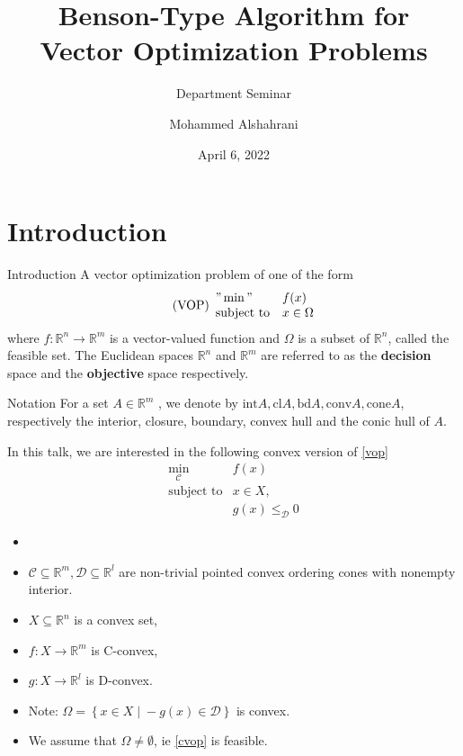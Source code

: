\documentclass[10pt,xcolor={table,dvipsnames},t,unknownkeysallowed]{beamer}
\title{\Large Benson-Type Algorithm for \\ Vector Optimization Problems}
\subtitle{Department Seminar}
\author{Mohammed Alshahrani}
\institute{Department of Mathematics | KFUPM}
\date{April 6, 2022}
\newcommand{\R}{\mathbb{R}}
\newcommand{\cone}[1]{\mathcal{#1}}
\newcommand{\intr}{\text{int}}
\begin{document}
\newtheorem{proposition}[theorem]{Proposition}
\newtheorem{remark}[theorem]{Remark}

\begin{frame}[plain]
  \titlepage
\end{frame}

\section{Introduction}

\begin{frame}{Introduction}
A vector optimization problem of one of the form
\begin{equation}\label{vop} \tag{VOP}
  \begin{array}{ll}
    "\min"& f(x)\\
    \text{subject to}& x\in \Omega
	   \end{array}
\end{equation}
where  $f:\mathbb{R}^n\to \R^m$ is a vector-valued function and $\Omega$ is a subset of $ \R^n$, called the feasible set. 
\newline
The Euclidean spaces $\R^n$ and $\R^m$ are referred to as the \alert{\textbf{decision}} space and the \alert{\textbf{objective}} space respectively. 
\begin{block}{Notation}
    For a set $A \in \R^m$ , we denote by $\intr{A}, \text{cl} A, \text{bd} A, \text{conv} A, \text{cone} A$, respectively the interior, closure, boundary, convex hull and the conic hull of $A$.
\end{block}
\end{frame}


\begin{frame}{}
    In this talk, we are interested in the following convex version of \eqref{vop}
    \begin{equation}\label{cvop} \tag{c-VOP}
      \begin{array}{ll}
        \min_{\cone{C}}& f(x)\\
        \text{subject to}& x\in X, \;\; \\
        & g(x)\leq_{\cone{D}} 0
    	   \end{array}
    \end{equation}
      \begin{itemize}[<+- | alert@+>]
    \item[]
    \item $\cone{C}\subseteq \R^m, \cone{D}\subseteq \R^l$ are non-trivial pointed convex ordering cones with nonempty
interior.
    \item $X \subseteq \R^n$ is a convex set, 
    \item $f : X \to \R^m$ is
C-convex, 
    \item $g : X \to \R^l$ is D-convex.
    \item Note: $\displaystyle \Omega = \left\{x\in X \;|\; -g(x)\in \cone{D} \right\}$ is convex.
    \item We assume that $\Omega\not=\emptyset$, ie \eqref{cvop} is feasible.
    
   \end{itemize}
\end{frame}
\end{document}
